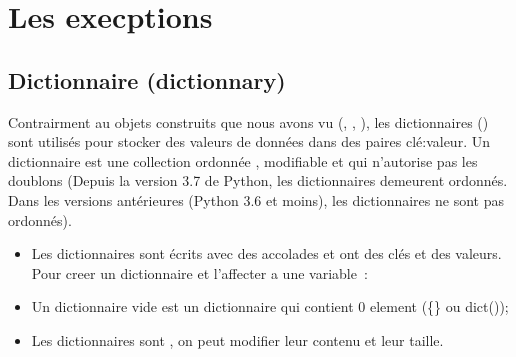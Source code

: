 \documentclass[letterpaper,10pt,french]{sphinxmanual}
\begin{document}
\section{Les execptions}
\label{\detokenize{ch8:les-execptions}}\label{\detokenize{ch8::doc}}

\subsection{Dictionnaire (dictionnary)}
\label{\detokenize{ch8:dictionnaire-dictionnary}}
\sphinxAtStartPar
Contrairment au objets construits que nous avons vu (, , ), les dictionnaires () sont utilisés pour stocker des valeurs de données dans des paires clé:valeur. Un dictionnaire est une collection ordonnée , modifiable et qui n’autorise pas les doublons (Depuis la version 3.7 de Python, les dictionnaires demeurent ordonnés. Dans les versions antérieures (Python 3.6 et moins), les dictionnaires ne sont pas ordonnés).
\begin{itemize}
\item {} 
\sphinxAtStartPar
Les dictionnaires sont écrits avec des accolades et ont des clés et des valeurs.  Pour creer un dictionnaire et l’affecter a une variable :

\end{itemize}

\begin{sphinxVerbatim}[commandchars=\\\{\}]
     
\end{sphinxVerbatim}
\begin{itemize}
\item {} 
\sphinxAtStartPar
Un dictionnaire vide est un dictionnaire qui contient 0 element (\{\} ou dict());

\item {} 
\sphinxAtStartPar
Les dictionnaires sont , on peut modifier leur contenu et leur taille.

\end{itemize}
\end{document}
